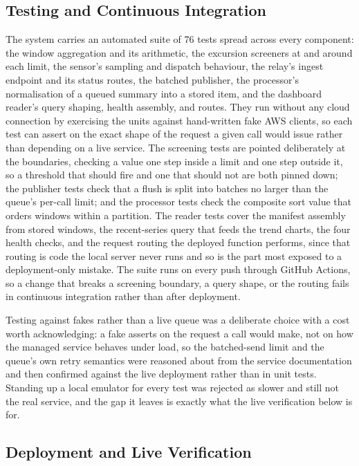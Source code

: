 \documentclass[conference]{IEEEtran}
\begin{document}
\subsection{Testing and Continuous Integration}

The system carries an automated suite of 76 tests spread across every component: the window aggregation and its arithmetic, the excursion screeners at and around each limit, the sensor's sampling and dispatch behaviour, the relay's ingest endpoint and its status routes, the batched publisher, the processor's normalisation of a queued summary into a stored item, and the dashboard reader's query shaping, health assembly, and routes. They run without any cloud connection by exercising the units against hand-written fake AWS clients, so each test can assert on the exact shape of the request a given call would issue rather than depending on a live service. The screening tests are pointed deliberately at the boundaries, checking a value one step inside a limit and one step outside it, so a threshold that should fire and one that should not are both pinned down; the publisher tests check that a flush is split into batches no larger than the queue's per-call limit; and the processor tests check the composite sort value that orders windows within a partition. The reader tests cover the manifest assembly from stored windows, the recent-series query that feeds the trend charts, the four health checks, and the request routing the deployed function performs, since that routing is code the local server never runs and so is the part most exposed to a deployment-only mistake. The suite runs on every push through GitHub Actions, so a change that breaks a screening boundary, a query shape, or the routing fails in continuous integration rather than after deployment.

Testing against fakes rather than a live queue was a deliberate choice with a cost worth acknowledging: a fake asserts on the request a call would make, not on how the managed service behaves under load, so the batched-send limit and the queue's own retry semantics were reasoned about from the service documentation \cite{awssqs} and then confirmed against the live deployment rather than in unit tests. Standing up a local emulator for every test was rejected as slower and still not the real service, and the gap it leaves is exactly what the live verification below is for.

\subsection{Deployment and Live Verification}
\end{document}
